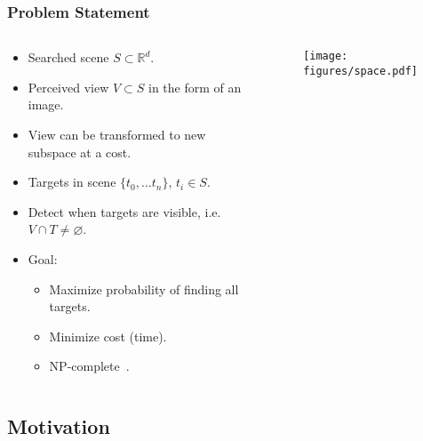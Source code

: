 \begin{frame}
    \frametitle{Problem Statement}

    \begin{columns}
        \begin{column}{0.6\textwidth}
            \begin{itemize}
                \item Searched scene \(S \subset \mathbb{R}^d\).
                \item Perceived view \(V \subset S\) in the form of an image.
                \item View can be transformed to new subspace at a cost.
                \item Targets in scene \(\{t_0, \dots t_n\}\), \(t_i \in S\).
                \item Detect when targets are visible, i.e. \(V \cap T \neq \varnothing\). 
                \item Goal:
                \begin{itemize}
                    \item Maximize probability of finding all targets.
                    \item Minimize cost (time).
                    \item NP-complete~\cite{andreopoulos_theory_2009}. %
                \end{itemize}
            \end{itemize}
        \end{column}
        \begin{column}{0.4\textwidth}
            \begin{figure}
                \centering
                \texttt{[image: figures/space.pdf]}
            \end{figure}
        \end{column}
    \end{columns}   


\end{frame}

\subsection{Motivation}

